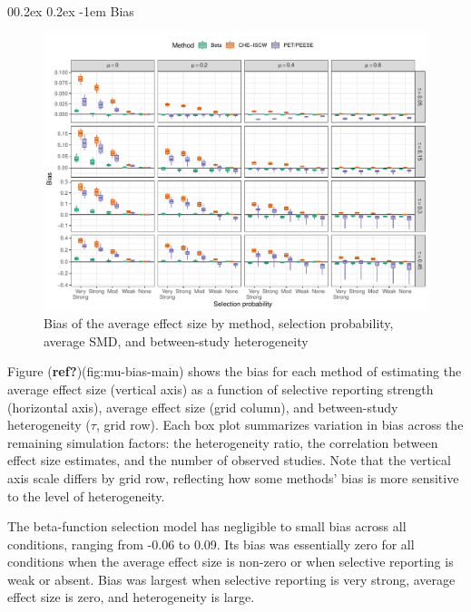 \documentclass[
  american,
  man, donotrepeattitle,floatsintext]{apa7}
\makeatletter
\let\oldparagraph\paragraph
\renewcommand{\paragraph}{
    \@ifstar
      \xxxParagraphStar
      \xxxParagraphNoStar
  }
\newcommand{\xxxParagraphStar}[1]{\oldparagraph*{#1}\mbox{}}
\newcommand{\xxxParagraphNoStar}[1]{\oldparagraph{#1}\mbox{}}
\renewcommand{\paragraph}{\@startsection{paragraph}{4}{\parindent}%
  {0\baselineskip \@plus 0.2ex \@minus 0.2ex}%
  {-1em}%
  {\normalfont\normalsize\bfseries\itshape\typesectitle}}
\makeatother
\begin{document}
\paragraph{Bias}\label{bias}

\begin{figure}
\includegraphics{beta-function-selection-models-with-dependent-effects_files/figure-latex/mu-bias-main-1} \caption{Bias of the average effect size by method, selection probability, average SMD, and between-study heterogeneity}\label{fig:mu-bias-main}
\end{figure}

Figure (\textbf{ref?})(fig:mu-bias-main) shows the bias for each method of estimating the average effect size (vertical axis) as a function of selective reporting strength (horizontal axis), average effect size (grid column), and between-study heterogeneity (\(\tau\), grid row). Each box plot summarizes variation in bias across the remaining simulation factors: the heterogeneity ratio, the correlation between effect size estimates, and the number of observed studies. Note that the vertical axis scale differs by grid row, reflecting how some methods' bias is more sensitive to the level of heterogeneity.

The beta-function selection model has negligible to small bias across all conditions, ranging from -0.06 to 0.09. Its bias was essentially zero for all conditions when the average effect size is non-zero or when selective reporting is weak or absent. Bias was largest when selective reporting is very strong, average effect size is zero, and heterogeneity is large.
\end{document}
